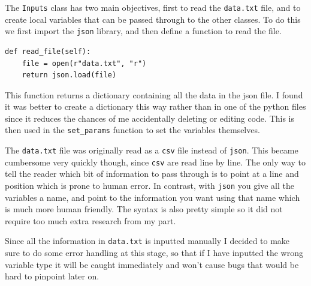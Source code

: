 The \verb!Inputs! class has two main objectives, first to read the \verb!data.txt! file, and to create local variables that can be passed through to the other classes. To do this we first import the \verb!json! library, and then define a function to read the file.

\begin{lstlisting}
def read_file(self):
    file = open(r"data.txt", "r")
    return json.load(file)\end{lstlisting}

This function returns a dictionary containing all the data in the json file. I found it was better to create a dictionary this way rather than in one of the python files since it reduces the chances of me accidentally deleting or editing code. This is then used in the \verb!set_params! function to set the variables themselves.

The \verb!data.txt! file was originally read as a \verb!csv! file instead of \verb!json!. This became cumbersome very quickly though, since \verb!csv! are read line by line. The only way to tell the reader which bit of information to pass through is to point at a line and position which is prone to human error. In contrast, with \verb!json! you give all the variables a name, and point to the information you want using that name which is much more human friendly. The syntax is also pretty simple so it did not require too much extra research from my part.

Since all the information in \verb!data.txt! is inputted manually I decided to make sure to do some error handling at this stage, so that if I have inputted the wrong variable type it will be caught immediately and won't cause bugs that would be hard to pinpoint later on.

